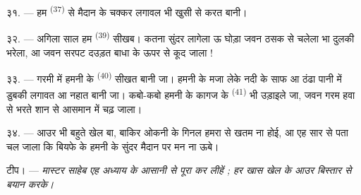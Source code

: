 \VUsaut{4.6mm}
\VUsaut{3.0mm}

३१. --- हम  \textsuperscript{(37)} से मैदान के चक्कर
लगावल भी खुसी से करत बानी।

३२. --- अगिला साल हम  \textsuperscript{(39)} सीखब।
कतना सुंदर लागेला ऊ घोड़ा जवन ठसक से चलेला भा दुलकी भरेला, आ जवन सरपट
दउड़त बाधा के ऊपर से कूद जाला !

३३. --- गरमी में हमनी के  \textsuperscript{(40)} सीखत
बानी जा। हमनी के मजा लेके नदी के साफ आ ठंढा पानी में डुबकी लगावत आ
नहात बानी जा। कबो-कबो हमनी के कागज के 
\textsuperscript{(41)} भी उड़ाइले जा, जवन गरम हवा से भरते शान से आसमान
में चढ़ जाला।

३४. --- आउर भी बहुते खेल बा, बाकिर ओकनी के गिनल हमरा से खतम ना होई, आ
एह सार से पता चल जाला कि बियफे के हमनी के सुंदर मैदान पर मन ना ऊबे।

टीप। --- \textit{मास्टर साहेब एह अध्याय के आसानी से पूरा कर लीहें ;
हर खास खेल के आउर बिस्तार से बयान करके।}
